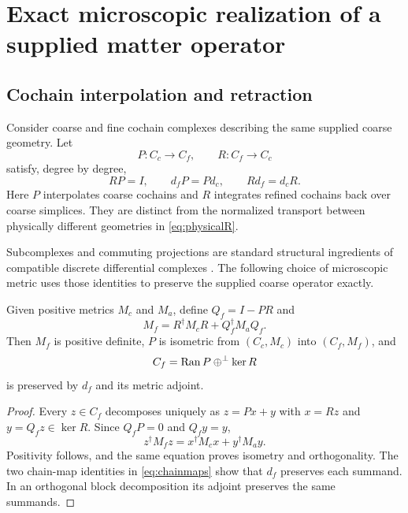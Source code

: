 \section{Exact microscopic realization of a supplied matter operator}
\label{sec:refinement}

\subsection{Cochain interpolation and retraction}

Consider coarse and fine cochain complexes describing the same supplied coarse geometry. Let
\begin{equation}
P:C_c\to C_f,\qquad R:C_f\to C_c
\end{equation}
satisfy, degree by degree,
\begin{equation}
RP=I,\qquad d_fP=Pd_c,\qquad Rd_f=d_cR.
\label{eq:chainmaps}
\end{equation}
Here $P$ interpolates coarse cochains and $R$ integrates refined cochains back over coarse simplices. They are distinct from the normalized transport between physically different geometries in \eqref{eq:physicalR}.

Subcomplexes and commuting projections are standard structural ingredients of compatible discrete differential complexes \cite{feec}. The following choice of microscopic metric uses those identities to preserve the supplied coarse operator exactly.

\begin{theorem}
\label{thm:metric}
Given positive metrics $M_c$ and $M_a$, define $Q_f=I-PR$ and
\begin{equation}
\boxed{M_f=R^\dagger M_cR+Q_f^\dagger M_aQ_f.}
\label{eq:Mf}
\end{equation}
Then $M_f$ is positive definite, $P$ is isometric from $(C_c,M_c)$ into $(C_f,M_f)$, and
\begin{equation}
C_f=\operatorname{Ran} P\oplus^\perp\ker R
\end{equation}
is preserved by $d_f$ and its metric adjoint.
\end{theorem}
\begin{proof}
Every $z\in C_f$ decomposes uniquely as $z=Px+y$ with $x=Rz$ and $y=Q_fz\in\ker R$. Since $Q_fP=0$ and $Q_fy=y$,
\begin{equation}
z^\dagger M_fz=x^\dagger M_cx+y^\dagger M_ay.
\end{equation}
Positivity follows, and the same equation proves isometry and orthogonality. The two chain-map identities in \eqref{eq:chainmaps} show that $d_f$ preserves each summand. In an orthogonal block decomposition its adjoint preserves the same summands.
\end{proof}

